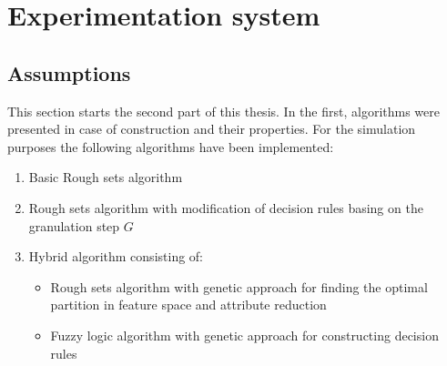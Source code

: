 \section{Experimentation system}
\label{cha:ExperimentAnalysis}
\subsection{Assumptions}
This section starts the second part of this thesis. In the first, algorithms
were presented in case of construction and their properties. For the simulation 
purposes the following algorithms have been implemented:
\begin{enumerate}
    \item Basic Rough sets algorithm
    \item Rough sets algorithm with modification of decision rules basing on
        the granulation step $G$
    \item Hybrid algorithm consisting of:
        \begin{itemize}
            \item Rough sets algorithm with genetic approach for finding the
                optimal partition in feature space and attribute reduction 
            \item Fuzzy logic algorithm with genetic approach for constructing
                decision rules
        \end{itemize}
\end{enumerate}


